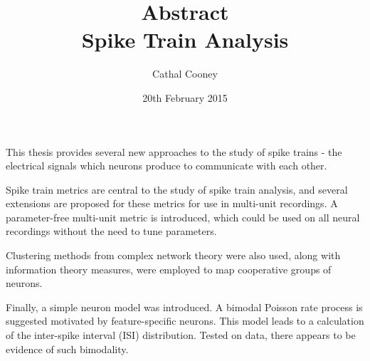 \documentclass[12pt]{article}
\begin{document}
\title{{\bf Abstract} \\ Spike Train Analysis}
\author{Cathal Cooney}
\date{20th February 2015}
\maketitle

This thesis provides several new approaches to the study of spike trains - the electrical signals which neurons produce to communicate with each other.

Spike train metrics are central to the study of spike train analysis, and several extensions are proposed for these metrics for use in multi-unit recordings.  A parameter-free multi-unit metric is introduced, which could be used on all neural recordings without the need to tune parameters.

Clustering methods from complex network theory were also used, along with information theory measures, were employed to map cooperative groups of neurons. 

Finally, a simple neuron model was introduced.  A bimodal Poisson rate process is suggested motivated by feature-specific neurons.  This model leads to a calculation of the inter-spike interval (ISI) distribution.  Tested on data, there appears to be evidence of such bimodality.
\end{document}
